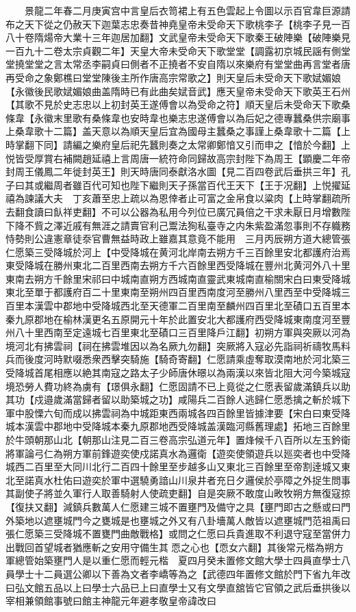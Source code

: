 　　景龍二年春二月庚寅宫中言皇后衣笥裙上有五色雲起上令圖以示百官韋巨源請布之天下從之仍赦天下迦葉志忠奏昔神堯皇帝未受命天下歌桃李子【桃李子見一百八十卷隋煬帝大業十三年迦居加翻】文武皇帝未受命天下歌秦王破陣樂【破陣樂見一百九十二卷太宗貞觀二年】天皇大帝未受命天下歌堂堂【調露初京城民謡有側堂堂撓堂堂之言太常丞李嗣貞曰側者不正撓者不安自隋以來樂府有堂堂曲再言堂者唐再受命之象鄭樵曰堂堂陳後主所作唐高宗常歌之】則天皇后未受命天下歌娬媚娘【永徽後民歌娬媚娘曲盖隋時已有此曲矣娬音武】應天皇帝未受命天下歌英王石州【其歌不見於史志忠以上初封英王遂傅會以為受命之符】順天皇后未受命天下歌桑條韋【永徽末里歌有桑條韋也安時韋也樂志忠遂傅會以為后妃之德專蠶桑供宗廟事上桑韋歌十二篇】盖天意以為順天皇后宜為國母主蠶桑之事謹上桑韋歌十二篇【上時掌翻下同】請編之樂府皇后祀先蠶則奏之太常卿鄭愔又引而申之【愔於今翻】上悦皆受厚賞右補闕趙延禧上言周唐一統符命同歸故高宗封陛下為周王【顕慶二年帝封周王儀鳳二年徙封英王】則天時唐同泰獻洛水圖【見二百四卷武后垂拱三年】孔子曰其或繼周者雖百代可知也陛下繼則天子孫當百代王天下【王于况翻】上悦擢延禧為諫議大夫　丁亥蕭至忠上疏以為恩倖者止可富之金帛食以粱肉【上時掌翻疏所去翻食讀曰飤祥吏翻】不可以公器為私用今列位已廣冗員倍之干求未厭日月增數陛下降不貲之澤近戚有無涯之請賣官利己鬻法狥私臺寺之内朱紫盈滿忽事則不存軄務恃勢則公違憲章徒沗官曹無益時政上雖嘉其意竟不能用　三月丙辰朔方道大總管張仁愿築三受降城於河上【中受降城在黄河北岸南去朔方千三百餘里安北都護府治焉東受降城在勝州東北二百里西南去朔方千六百餘里西受降城在豐州北黄河外八十里東南去朔方千餘里宋祁曰中城南直朔方西城南直靈武東城南直榆關宋白曰東受降城東北至單于都護府百二十里東南至朔州四百里西南度河至勝州八里西至中受降城三百里本漢雲中郡地中受降城西北至天德軍二百里南至麟州四百里北至磧口五百里本秦九原郡地在榆林漢更名五原開元十年於此置安北大都護府西受降城東南度河至豐州八十里西南至定遠城七百里東北至磧口三百里降戶江翻】初朔方軍與突厥以河為境河北有拂雲祠【祠在拂雲堆因以為名厥九勿翻】突厥將入寇必先詣祠祈禱牧馬料兵而後度河時默啜悉衆西擊突騎施【騎奇寄翻】仁愿請乘虛奪取漠南地於河北築三受降城首尾相應以絶其南寇之路太子少師唐休暻以為兩漢以來皆北阻大河今築城寇境恐勞人費功終為虜有【璟俱永翻】仁愿固請不已上竟從之仁愿表留歲滿鎮兵以助其功【戍邉歲滿當歸者留以助築城之功】咸陽兵二百餘人逃歸仁愿悉擒之斬於城下軍中股慄六旬而成以拂雲祠為中城距東西兩城各四百餘里皆據津要【宋白曰東受降城本漢雲中郡地中受降城本秦九原郡地西受降城盖漢臨河縣舊理處】拓地三百餘里於牛頭朝那山北【朝那山注見二百三卷高宗弘道元年】置烽候千八百所以左玉鈐衛將軍論弓仁為朔方軍前鋒遊奕使戍諾真水為邏衛【遊奕使領遊兵以廵奕者也中受降城西二百里至大同川北行二百四十餘里至步越多山又東北三百餘里至帝割逹城又東北至諾真水杜佑曰遊奕於軍中選驍勇諳山川泉井者充日夕邏侯於亭障之外捉生問事其副使子將並久軍行人取善騎射人使疏吏翻】自是突厥不敢度山畋牧朔方無復寇掠【復扶又翻】減鎮兵數萬人仁愿建三城不置壅門及備守之具【壅門即古之懸或曰門外築地以遮壅城門今之甕城是也壅城之外又有八卦墻萬人敵皆以遮壅城門范祖禹曰張仁愿築三受降城不置甕門曲敵戰格】或問之仁愿曰兵貴進取不利退守寇至當併力出戰回首望城者猶應斬之安用守備生其恧之心也【恧女六翻】其後常元楷為朔方軍總管始築壅門人是以重仁愿而輕元楷　夏四月癸未置修文館大學士四員直學士八員學士十二員選公卿以下善為文者李嶠等為之【武德四年置修文館於門下省九年改曰弘文館五品以上曰學士六品已上曰直學士又有文學直舘皆它官領之武后垂拱後以宰相兼領館事號曰館主神龍元年避孝敬皇帝諱改曰